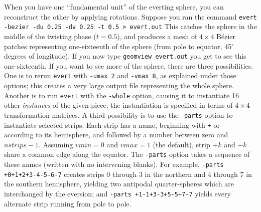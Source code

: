 When you have one ``fundamental unit'' of the everting sphere, you can reconstruct the other by applying rotations. Suppose you ran the command
%
\smallbreak
{\tt evert -bezier -du 0.25 -dv 0.25 -t 0.5 > evert.out}
\smallbreak\noindent
%
This catches the sphere in the middle of the twisting phase ($t=0.5$), and produces a mesh of $4\times 4$ B\'ezier patches representing
one-sixteenth of the sphere (from pole to equator, 45$^\circ$ degrees of longitude). If you now type
%
\smallbreak
{\tt geomview evert.out}
\smallbreak\noindent
%
you get to see this one-sixteenth. If you want to see more of the sphere, there are three possibilities. One is to rerun {\tt evert} with {\tt-umax 2} and {\tt-vmax 8}, as explained under
those options; this creates a very large output file representing the whole sphere. Another is to run {\tt evert} with the {\tt -whole} option, causing it to instantiate 16 other
{\it instances} of the given piece; the instantiation is specified in terms of $4\times4$ transformation matrices. A third possibility is to use the {\tt -parts} option to instantiate
selected strips. Each strip has a name, beginning with {\tt +} or {\tt -} according to its hemisphere, and followed by a number between zero and $nstrips-1$. Assuming $vmin=0$ and $vmax=1$
(the default), strip $+k$ and $-k$ share a common edge along the equator. The {\tt -parts} option takes a sequence of these names (written with no intervening blanks).  For example,
{\tt -parts +0+1+2+3-4-5-6-7} creates strips 0 through 3 in the northern and 4 through 7 in the southern hemisphere, yielding two antipodal quarter-spheres which are interchanged by the
eversion; and {\tt -parts +1-1+3-3+5-5+7-7} yields every alternate strip running from pole to pole.

